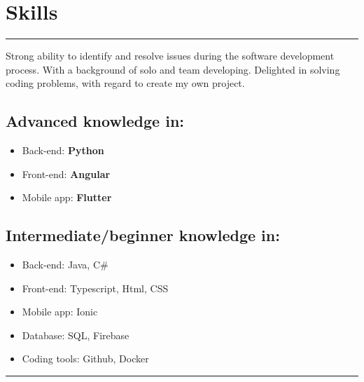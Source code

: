 \documentclass[a4paper,10pt]{article}
\begin{document}
\begin{minipage}[t]{0.25\textwidth}
    \section*{Skills}
    \vspace{5.6cm}
    \rule{0.6cm}{0.3mm}
\end{minipage}
\hfill
\begin{minipage}[t]{0.75\textwidth}
    
    Strong ability to identify and resolve issues during the software development process. With a background of solo and team developing. Delighted in solving coding problems, with regard to create my own project.
    \subsection*{Advanced knowledge in:}
    \begin{itemize}[leftmargin=1cm]
        \item Back-end: \textbf{Python} 
        \item Front-end: \textbf{Angular}
        \item Mobile app: \textbf{Flutter}
    \end{itemize}
    \subsection*{Intermediate/beginner knowledge in:}
    \begin{itemize}[leftmargin=1cm]
        \item Back-end: Java, C\# 
        \item Front-end: Typescript, Html, CSS
        \item Mobile app: Ionic
        \item Database: SQL, Firebase
        \item Coding tools: Github, Docker
    \end{itemize}

    \rule{\linewidth}{0.5mm}
\end{minipage}
\end{document}
